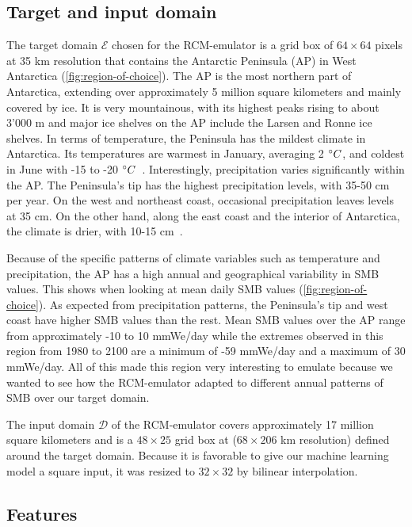 \documentclass[a4paper,11pt,oneside]{report}
\begin{document}
\subsection{Target and input domain}
The target domain $\mathcal{E}$ chosen for the RCM-emulator is a grid box of $64 \times 64$ pixels at 35 \si{km} resolution that contains the Antarctic Peninsula (AP) in West Antarctica (\autoref{fig:region-of-choice}). The AP is the most northern part of Antarctica, extending over approximately 5 million square kilometers and mainly covered by ice. It is very mountainous, with its highest peaks rising to about 3'000 \si{m} and major ice shelves on the AP include the Larsen and Ronne ice shelves. In terms of temperature, the Peninsula has the mildest climate in Antarctica. Its temperatures are warmest in January, averaging 2 $\degree C$, and coldest in June with -15 to -20 $\degree C$~\cite{AntarcticPeninsula}. Interestingly, precipitation varies significantly within the AP. The Peninsula's tip has the highest precipitation levels, with 35-50 \si{cm} per year. On the west and northeast coast, occasional precipitation leaves levels at 35 \si{cm}. On the other hand, along the east coast and the interior of Antarctica, the climate is drier, with 10-15 \si{cm}~\cite{antarctic-climate, antarctic-climate-2}. 


 Because of the specific patterns of climate variables such as temperature and precipitation, the AP has a high annual and geographical variability in SMB values. This shows when looking at mean daily SMB values (\autoref{fig:region-of-choice}). As expected from precipitation patterns, the Peninsula's tip and west coast have higher SMB values than the rest. Mean SMB values over the AP range from approximately -10 to 10 \si{mmWe/day} while the extremes observed in this region from 1980 to 2100 are a minimum of -59 \si{mmWe/day} and a maximum of 30 \si{mmWe/day}. All of this made this region very interesting to emulate because we wanted to see how the RCM-emulator adapted to different annual patterns of SMB over our target domain. 
 
 The input domain $\mathcal{D}$ of the RCM-emulator covers approximately 17 million square kilometers and is a $48\times25$ grid box at ($68 \times 206$ \si{km} resolution) defined around the target domain. Because it is favorable to give our machine learning model a square input, it was resized to $32\times 32$ by bilinear interpolation. 



\subsection{Features}\label{subsec:features}
\end{document}

